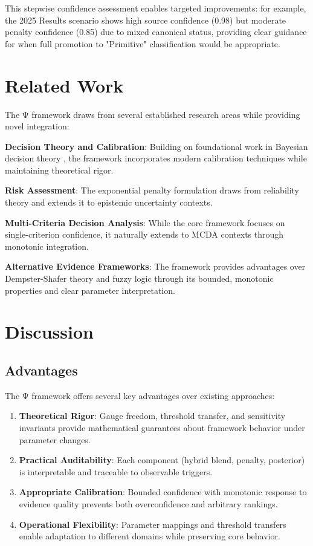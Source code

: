 \documentclass[12pt,a4paper]{article}
\begin{document}
This stepwise confidence assessment enables targeted improvements: for example, the 2025 Results scenario shows high source confidence (0.98) but moderate penalty confidence (0.85) due to mixed canonical status, providing clear guidance for when full promotion to "Primitive" classification would be appropriate.

\section{Related Work}

The Ψ framework draws from several established research areas while providing novel integration:

\textbf{Decision Theory and Calibration}: Building on foundational work in Bayesian decision theory \citep{Berger1985, Savage1954}, the framework incorporates modern calibration techniques \citep{GneitingRaftery2007, Guo2017} while maintaining theoretical rigor.

\textbf{Risk Assessment}: The exponential penalty formulation draws from reliability theory \citep{Cox1972, BarlowProschan1981} and extends it to epistemic uncertainty contexts.

\textbf{Multi-Criteria Decision Analysis}: While the core framework focuses on single-criterion confidence, it naturally extends to MCDA contexts \citep{KeeneyRaiffa1993, Saaty1980} through monotonic integration.

\textbf{Alternative Evidence Frameworks}: The framework provides advantages over Dempster-Shafer theory \citep{Shafer1976} and fuzzy logic \citep{Zadeh1965} through its bounded, monotonic properties and clear parameter interpretation.

\section{Discussion}

\subsection{Advantages}

The Ψ framework offers several key advantages over existing approaches:

\begin{enumerate}
\item \textbf{Theoretical Rigor}: Gauge freedom, threshold transfer, and sensitivity invariants provide mathematical guarantees about framework behavior under parameter changes.

\item \textbf{Practical Auditability}: Each component (hybrid blend, penalty, posterior) is interpretable and traceable to observable triggers.

\item \textbf{Appropriate Calibration}: Bounded confidence with monotonic response to evidence quality prevents both overconfidence and arbitrary rankings.

\item \textbf{Operational Flexibility}: Parameter mappings and threshold transfers enable adaptation to different domains while preserving core behavior.
\end{enumerate}
\end{document}
